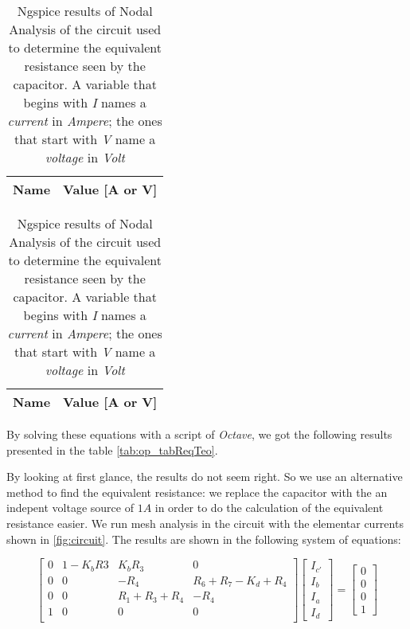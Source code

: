\begin{table}
  \parbox{.45\linewidth}{
    \centering
    \begin{tabular}{|c|c|}
      \hline
      {\bf Name} & {\bf Value [A or V]} \\ \hline
      
    \end{tabular}
    \label{tab:op_tabReqTeo}
    \caption{Theoretical Results of Nodal Analysis of the circuit used to determine the equivalent resistance seen by the capacitor. A variable that begins  with \textit{I} names a \textit{current} in \textit{Ampere}; the ones that start with \textit{V} name a \textit{voltage} in \textit{Volt} }
  }
  \hfill
  \parbox{.45\linewidth}{
    \centering
    \begin{tabular}{|c|c|}
      {\bf Name} & {\bf Value [A or V]} \\ \hline
      
      \hline
    \end{tabular}
    \label{tab:op_tabReqSpice}
    \caption{Ngspice results of Nodal Analysis of the circuit used to determine the equivalent resistance seen by the capacitor. A variable that begins  with \textit{I} names a \textit{current} in \textit{Ampere}; the ones that start with \textit{V} name a \textit{voltage} in \textit{Volt} }
  }
\end{table}

By solving these equations with a script of \textit{Octave}, we got the following results presented in the table \ref{tab:op_tabReqTeo}.


By looking at first glance, the results do not seem right. So we use an alternative method to find the equivalent resistance: we replace the capacitor with the an indepent voltage source of $1 A$ in order to do the calculation of the equivalent resistance easier.
We run mesh analysis in the circuit with the elementar currents shown in \ref{fig:circuit}. The results are shown in the following system of equations:

\[
  \begin{bmatrix}
    0 & 1-K_b R3 & K_b R_3         & 0                     \\
    0 & 0        & -R_4            & R_6 + R_7 - K_d + R_4 \\
    0 & 0        & R_1 + R_3 + R_4 & -R_4                  \\
    1 & 0        & 0               & 0                     \\
  \end{bmatrix}
  \begin{bmatrix}
    I_{c'} \\ I_b \\ I_a \\ I_d
  \end{bmatrix}
  =
  \begin{bmatrix}
    0 \\ 0 \\ 0 \\ 1
  \end{bmatrix}
\]

